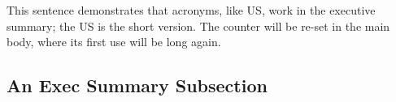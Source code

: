 \documentclass[twoside,thesis]{npsreport2018}
\begin{document}
{\begin{bibunit}[npsthesis]
This sentence demonstrates that acronyms, like \ac{US}, work in the
executive summary; the \ac{US} is the short version. The counter will be re-set
in the main body, where its first use will be long again.

\subsection*{An Exec Summary Subsection}
\lipsum[2-3] %

%
%
\begingroup
 \let\stdthebibliography\thebibliography
 \renewcommand{\thebibliography}{%
 \let\chapter\subsubsection
 \titlespacing*{\subsubsection}{0pt}{5ex plus 2ex}{-1ex plus .2ex}
 \stdthebibliography}
 \raggedright     %
 \singlespacing   %
 \normalsize
 \putbib[references]  %
\endgroup
%
%
\end{bibunit}    %
}

%
%
\NPSacknowledgements{%
\lipsum[1-3] %
}

\NPSbody


%

%
%


%

\end{document}
